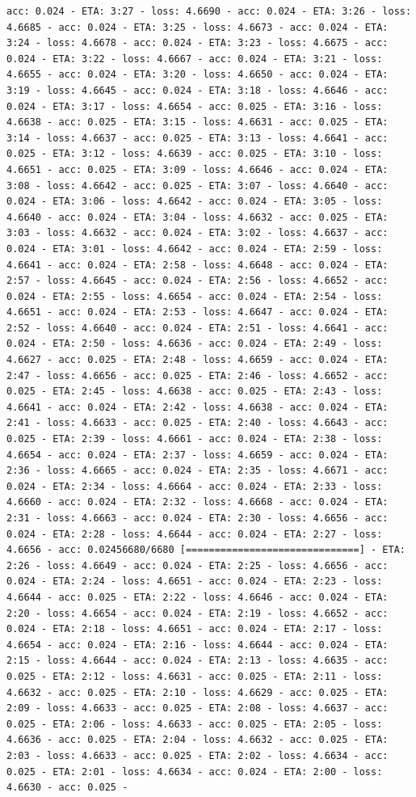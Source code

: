 \documentclass[11pt]{article}
\begin{document}
\begin{Verbatim}[commandchars=\\\{\}]
acc: 0.024 - ETA: 3:27 - loss: 4.6690 - acc: 0.024 - ETA: 3:26 - loss: 4.6685 - acc: 0.024 - ETA: 3:25 - loss: 4.6673 - acc: 0.024 - ETA: 3:24 - loss: 4.6678 - acc: 0.024 - ETA: 3:23 - loss: 4.6675 - acc: 0.024 - ETA: 3:22 - loss: 4.6667 - acc: 0.024 - ETA: 3:21 - loss: 4.6655 - acc: 0.024 - ETA: 3:20 - loss: 4.6650 - acc: 0.024 - ETA: 3:19 - loss: 4.6645 - acc: 0.024 - ETA: 3:18 - loss: 4.6646 - acc: 0.024 - ETA: 3:17 - loss: 4.6654 - acc: 0.025 - ETA: 3:16 - loss: 4.6638 - acc: 0.025 - ETA: 3:15 - loss: 4.6631 - acc: 0.025 - ETA: 3:14 - loss: 4.6637 - acc: 0.025 - ETA: 3:13 - loss: 4.6641 - acc: 0.025 - ETA: 3:12 - loss: 4.6639 - acc: 0.025 - ETA: 3:10 - loss: 4.6651 - acc: 0.025 - ETA: 3:09 - loss: 4.6646 - acc: 0.024 - ETA: 3:08 - loss: 4.6642 - acc: 0.025 - ETA: 3:07 - loss: 4.6640 - acc: 0.024 - ETA: 3:06 - loss: 4.6642 - acc: 0.024 - ETA: 3:05 - loss: 4.6640 - acc: 0.024 - ETA: 3:04 - loss: 4.6632 - acc: 0.025 - ETA: 3:03 - loss: 4.6632 - acc: 0.024 - ETA: 3:02 - loss: 4.6637 - acc: 0.024 - ETA: 3:01 - loss: 4.6642 - acc: 0.024 - ETA: 2:59 - loss: 4.6641 - acc: 0.024 - ETA: 2:58 - loss: 4.6648 - acc: 0.024 - ETA: 2:57 - loss: 4.6645 - acc: 0.024 - ETA: 2:56 - loss: 4.6652 - acc: 0.024 - ETA: 2:55 - loss: 4.6654 - acc: 0.024 - ETA: 2:54 - loss: 4.6651 - acc: 0.024 - ETA: 2:53 - loss: 4.6647 - acc: 0.024 - ETA: 2:52 - loss: 4.6640 - acc: 0.024 - ETA: 2:51 - loss: 4.6641 - acc: 0.024 - ETA: 2:50 - loss: 4.6636 - acc: 0.024 - ETA: 2:49 - loss: 4.6627 - acc: 0.025 - ETA: 2:48 - loss: 4.6659 - acc: 0.024 - ETA: 2:47 - loss: 4.6656 - acc: 0.025 - ETA: 2:46 - loss: 4.6652 - acc: 0.025 - ETA: 2:45 - loss: 4.6638 - acc: 0.025 - ETA: 2:43 - loss: 4.6641 - acc: 0.024 - ETA: 2:42 - loss: 4.6638 - acc: 0.024 - ETA: 2:41 - loss: 4.6633 - acc: 0.025 - ETA: 2:40 - loss: 4.6643 - acc: 0.025 - ETA: 2:39 - loss: 4.6661 - acc: 0.024 - ETA: 2:38 - loss: 4.6654 - acc: 0.024 - ETA: 2:37 - loss: 4.6659 - acc: 0.024 - ETA: 2:36 - loss: 4.6665 - acc: 0.024 - ETA: 2:35 - loss: 4.6671 - acc: 0.024 - ETA: 2:34 - loss: 4.6664 - acc: 0.024 - ETA: 2:33 - loss: 4.6660 - acc: 0.024 - ETA: 2:32 - loss: 4.6668 - acc: 0.024 - ETA: 2:31 - loss: 4.6663 - acc: 0.024 - ETA: 2:30 - loss: 4.6656 - acc: 0.024 - ETA: 2:28 - loss: 4.6644 - acc: 0.024 - ETA: 2:27 - loss: 4.6656 - acc: 0.02456680/6680 [==============================] - ETA: 2:26 - loss: 4.6649 - acc: 0.024 - ETA: 2:25 - loss: 4.6656 - acc: 0.024 - ETA: 2:24 - loss: 4.6651 - acc: 0.024 - ETA: 2:23 - loss: 4.6644 - acc: 0.025 - ETA: 2:22 - loss: 4.6646 - acc: 0.024 - ETA: 2:20 - loss: 4.6654 - acc: 0.024 - ETA: 2:19 - loss: 4.6652 - acc: 0.024 - ETA: 2:18 - loss: 4.6651 - acc: 0.024 - ETA: 2:17 - loss: 4.6654 - acc: 0.024 - ETA: 2:16 - loss: 4.6644 - acc: 0.024 - ETA: 2:15 - loss: 4.6644 - acc: 0.024 - ETA: 2:13 - loss: 4.6635 - acc: 0.025 - ETA: 2:12 - loss: 4.6631 - acc: 0.025 - ETA: 2:11 - loss: 4.6632 - acc: 0.025 - ETA: 2:10 - loss: 4.6629 - acc: 0.025 - ETA: 2:09 - loss: 4.6633 - acc: 0.025 - ETA: 2:08 - loss: 4.6637 - acc: 0.025 - ETA: 2:06 - loss: 4.6633 - acc: 0.025 - ETA: 2:05 - loss: 4.6636 - acc: 0.025 - ETA: 2:04 - loss: 4.6632 - acc: 0.025 - ETA: 2:03 - loss: 4.6633 - acc: 0.025 - ETA: 2:02 - loss: 4.6634 - acc: 0.025 - ETA: 2:01 - loss: 4.6634 - acc: 0.024 - ETA: 2:00 - loss: 4.6630 - acc: 0.025 - 
\end{Verbatim}
\end{document}

